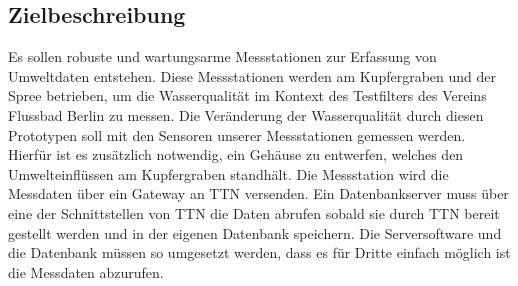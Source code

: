 \subsection{Zielbeschreibung}

Es sollen robuste und wartungsarme Messstationen zur Erfassung von Umweltdaten entstehen. Diese Messstationen werden am Kupfergraben und
der Spree betrieben, um die Wasserqualität im Kontext des Testfilters des Vereins Flussbad Berlin zu messen. Die Veränderung der Wasserqualität
durch diesen Prototypen soll mit den Sensoren unserer Messstationen gemessen werden. Hierfür ist es zusätzlich notwendig, ein Gehäuse zu entwerfen,
welches den Umwelteinflüssen am Kupfergraben standhält.\newline
Die Messstation wird die Messdaten über ein Gateway an TTN versenden. Ein Datenbankserver muss über eine der Schnittstellen von TTN die Daten
abrufen sobald sie durch TTN bereit gestellt werden und in der eigenen Datenbank speichern. Die Serversoftware und die Datenbank müssen so
umgesetzt werden, dass es für Dritte einfach möglich ist die Messdaten abzurufen.
